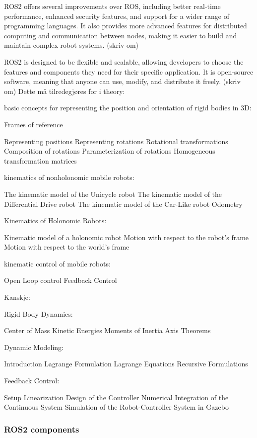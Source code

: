 ROS2 offers several improvements over ROS, including better real-time performance, enhanced security features, and support for a wider range of programming languages. It also provides more advanced features for distributed computing and communication between nodes, making it easier to build and maintain complex robot systems. (skriv om)

ROS2 is designed to be flexible and scalable, allowing developers to choose the features and components they need for their specific application. It is open-source software, meaning that anyone can use, modify, and distribute it freely. (skriv om)
Dette må tilredegjøres for i theory:

basic concepts for representing the position and orientation of rigid bodies in 3D:

Frames of reference 

Representing positions
Representing rotations
Rotational transformations
Composition of rotations
Parameterization of rotations
Homogeneous transformation matrices

 kinematics of nonholonomic mobile robots:

 The kinematic model of the Unicycle robot
The kinematic model of the Differential Drive robot
The kinematic model of the Car-Like robot
Odometry

 Kinematics of Holonomic Robots:

 Kinematic model of a holonomic robot
Motion with respect to the robot’s frame
Motion with respect to the world’s frame

kinematic control of mobile robots:

Open Loop control
Feedback Control

Kanskje:

Rigid Body Dynamics:

Center of Mass
Kinetic Energies
Moments of Inertia
Axis Theorems

Dynamic Modeling:

Introduction
Lagrange Formulation
Lagrange Equations
Recursive Formulations

Feedback Control:

Setup
Linearization
Design of the Controller
Numerical Integration of the Continuous System
Simulation of the Robot-Controller System in Gazebo

\subsubsection{ROS2 components} 

